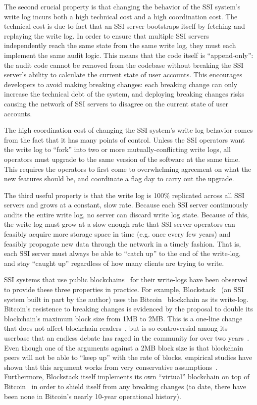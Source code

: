The second crucial property is that changing the behavior of the SSI system's write log
incurs both a high technical cost and a high coordination cost.  The technical
cost is due to fact that an SSI server
bootstraps itself by fetching and replaying the write log.  In order to
ensure that multiple SSI servers independently reach the same state from the
same write log, they must each implement the same audit logic.  This means that
the code itself is ``append-only'':  the audit code cannot be removed from
the codebase without breaking the SSI server's ability to calculate the current
state of user accounts.  This encourages developers to avoid making breaking
changes: each breaking change can only increase the technical debt of the
system, and deploying breaking changes risks causing the network of SSI servers
to disagree on the current state of user accounts.

The high coordination cost of changing the SSI system's write log behavior
comes from the fact that it has many points of control.  Unless the SSI
operators want the write log to ``fork'' into two or more mutually-conflicting
write logs, all operators must upgrade to the same version of the software
at the same time.  This requires the operators to first come to overwhelming
agreement on what the new features should be, and coordinate a flag day
to carry out the upgrade.

The third useful property is that the write log is 100\% replicated across all
SSI servers and grows at a constant, slow rate.
Because each SSI server continuously audits the entire write log, no server can discard
write log state.  Because of this, the write log must grow at a slow enough rate
that SSI server operators can feasibly acquire more storage space in time (e.g. once
every few years) and feasibly propagate new data through the network in a timely
fashion.  That is, each SSI server must always be able to ``catch up'' to the
end of the write-log, and stay ``caught up'' regardless of how many clients are
trying to write.

SSI systems that use public blockchains~\cite{bitcoin} for their write-logs
have been observed to provide these three properties
in practice.  For example, Blockstack~\cite{blockstack} (an SSI system built in part
by the author) uses the
Bitcoin~\cite{bitcoin} blockchain as its write-log.  Bitcoin's resistence
to breaking changes is evidenced by the proposal to double its blockchain's
maximum block size from 1MB to 2MB.  This is a one-line change that does not affect blockchain
readers~\cite{bitcoin-code-blocksize}, but is so controversial among its userbase that an endless debate has
raged in the community for over two years~\cite{bitcoin-scaling-debate}.  Even
though one of the arguments against a 2MB block size is that blockchain peers
will not be able to ``keep up'' with the rate of blocks, empirical studies have
shown that this argument works from very conservative
assumptions~\cite{blockchain-blocksize-analysis-from-ic3}.  Furthermore, 
Blockstack itself implements its own ``virtual'' blockchain on top of
Bitcoin~\cite{virtualchain} in order to shield itself from any breaking changes
(to date, there have been none in Bitcoin's nearly 10-year operational history).

